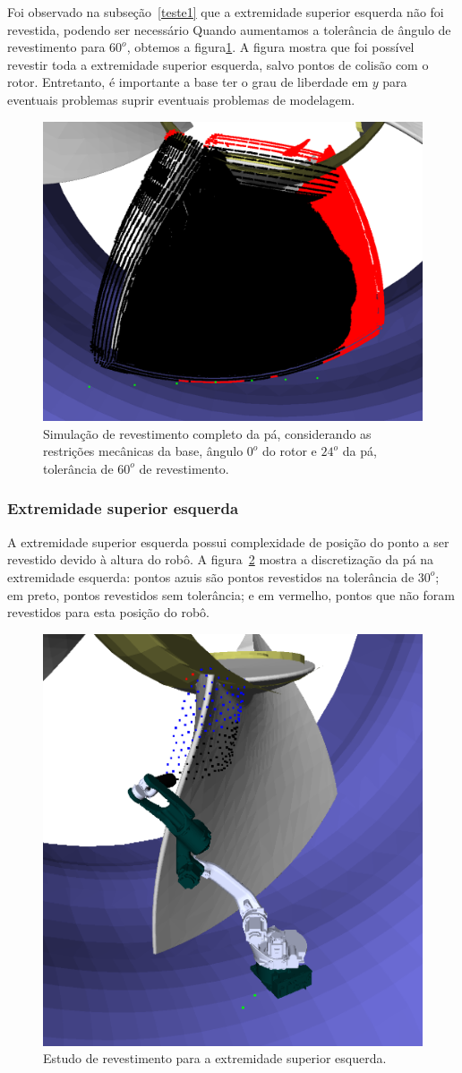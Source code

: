Foi observado na subseção~\ref{teste1} que a extremidade superior esquerda não
foi revestida, podendo ser necessário  Quando aumentamos a tolerância de ângulo
de revestimento para $60^o$, obtemos a figura\ref{fig::simcomp1_3}. A figura mostra que foi possível revestir toda a
extremidade superior esquerda, salvo pontos de colisão com o rotor. Entretanto,
é importante a base ter o grau de liberdade em $y$ para eventuais problemas
suprir eventuais problemas de modelagem.

\begin{figure}[!ht]
	\centering	
	\includegraphics[width=.5\columnwidth]{figs/simcomp1_3.png}
	\caption{Simulação de revestimento completo da pá, considerando as
	restrições mecânicas da base, ângulo $0^o$ do rotor e $24^o$ da pá,
	tolerância de $60^o$ de revestimento.}
	\label{fig::simcomp1_3}
\end{figure}

\subsubsection{Extremidade superior esquerda}

A extremidade superior esquerda possui complexidade de posição do ponto a
ser revestido devido à altura do robô. A figura~\ref{fig::shoulderleft} mostra
a discretização da pá na extremidade esquerda: pontos azuis são pontos revestidos na tolerância de
$30^o$; em preto, pontos revestidos sem tolerância; e em vermelho, pontos que
não foram revestidos para esta posição do robô.

\begin{figure}[!ht]
	\centering	
	\includegraphics[width=.5\columnwidth]{figs/shoulderleft.png}
	\caption{Estudo de revestimento para a extremidade superior esquerda.}
	\label{fig::shoulderleft}
\end{figure}

